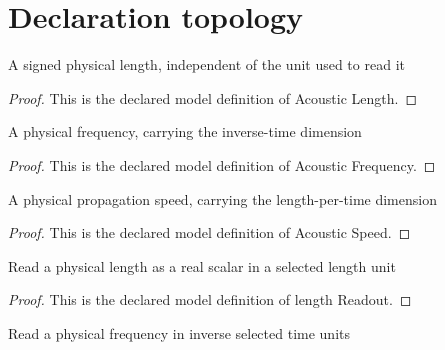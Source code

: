\section{Declaration topology}
\begin{definition}
  \label{def:physics:phyx-mini-0175:phyxminiproblems-problemphyxmini0175-acousticlength}
  A signed physical length, independent of the unit used to read it
\end{definition}
\begin{proof}
  This is the declared model definition of Acoustic Length.
\end{proof}
\begin{definition}
  \label{def:physics:phyx-mini-0175:phyxminiproblems-problemphyxmini0175-acousticfrequency}
  A physical frequency, carrying the inverse-time dimension
\end{definition}
\begin{proof}
  This is the declared model definition of Acoustic Frequency.
\end{proof}
\begin{definition}
  \label{def:physics:phyx-mini-0175:phyxminiproblems-problemphyxmini0175-acousticspeed}
  A physical propagation speed, carrying the length-per-time dimension
\end{definition}
\begin{proof}
  This is the declared model definition of Acoustic Speed.
\end{proof}
\begin{definition}
  \label{def:physics:phyx-mini-0175:phyxminiproblems-problemphyxmini0175-lengthreadout}
  Read a physical length as a real scalar in a selected length unit
\end{definition}
\begin{proof}
  This is the declared model definition of length Readout.
\end{proof}
\begin{definition}
  \label{def:physics:phyx-mini-0175:phyxminiproblems-problemphyxmini0175-frequencyreadout}
  Read a physical frequency in inverse selected time units
\end{definition}
